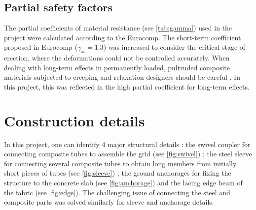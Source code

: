 


\subsection{Partial safety factors}\label{sec=safety}
The partial coefficients of material resistance (see \cref{tab:gamma}) used in the project were calculated according to the Eurocomp. The short-term coefficient proposed in Eurocomp ($\gamma_{st} = 1.3$) was increased to consider the critical stage of erection, where the deformations could not be controlled accurately.
When dealing with long-term effects in permanently loaded, pultruded composite materials subjected to creeping and relaxation designers should be careful  \cite{Kotelnikova2012,Bank2006}. In this project, this was reflected in the high partial coefficient for long-term effects.

\pagebreak
\section{Construction details}\label{sec=construction_details}
In this project, one can identify 4 major structural details : the swivel coupler for connecting composite tubes to assemble the grid (see \cref{fig:swivel}) ; the steel sleeve for connecting several composite tubes to obtain long members from initially short pieces of tubes (see \cref{fig:sleeve}) ; the ground anchorages for fixing the structure to the concrete slab (see \cref{fig:anchorage}) and the lacing edge beam of the fabric (see \cref{fig:edge}). The challenging issue of connecting the steel and composite parts was solved similarly for sleeve and anchorage details.

